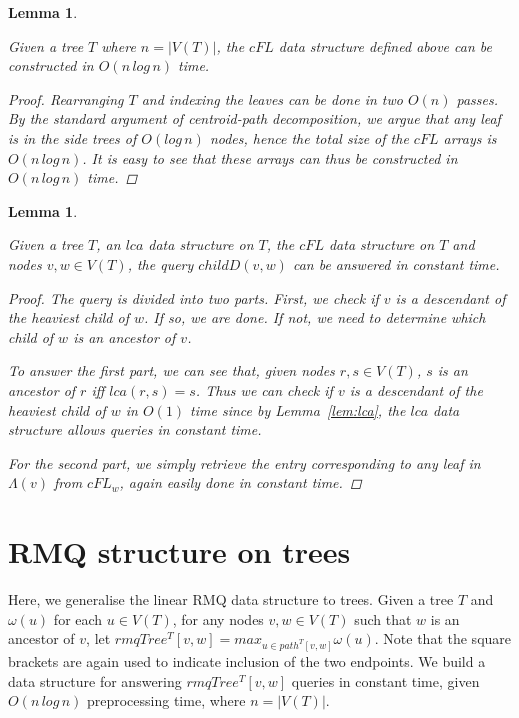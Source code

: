 \documentclass{article}
\newcommand{\leafset}{\Lambda}
\newcommand{\weight}{\omega}
\newtheorem{cfddatastructure}[incompatibility]{Lemma}
\newtheorem{cfdquery}[incompatibility]{Lemma}
\begin{document}
    \begin{cfddatastructure}
        \label{lem:cfddatastructure}

        Given a tree $T$ where $n = |V(T)|$, the $cFL$ data structure defined above can be constructed in $O(n\,log\,n)$ time.

        \begin{proof}
            Rearranging $T$ and indexing the leaves can be done in two $O(n)$ passes. By the standard argument of centroid-path decomposition, we argue that any leaf is in the side trees of $O(log\,n)$ nodes, hence the total size of the $cFL$ arrays is $O(n\,log\,n)$. It is easy to see that these arrays can thus be constructed in $O(n\,log\,n)$ time.
        \end{proof}
    \end{cfddatastructure}

    \medskip
    \begin{cfdquery}
        \label{lem:cfdquery}

        Given a tree $T$, an $lca$ data structure on $T$, the $cFL$ data structure on $T$ and nodes $v, w \in V(T)$, the query $childD(v, w)$ can be answered in constant time.

        \begin{proof}
            The query is divided into two parts. First, we check if $v$ is a descendant of the heaviest child of $w$. If so, we are done. If not, we need to determine which child of $w$ is an ancestor of $v$.

            To answer the first part, we can see that, given nodes $r, s \in V(T)$, $s$ is an ancestor of $r$ iff $lca(r, s) = s$. Thus we can check if $v$ is a descendant of the heaviest child of $w$ in $O(1)$ time since by Lemma~\ref{lem:lca}, the $lca$ data structure allows queries in constant time.

            For the second part, we simply retrieve the entry corresponding to any leaf in $\leafset(v)$ from $cFL_w$, again easily done in constant time.
        \end{proof}
    \end{cfdquery}

    \section{RMQ structure on trees}
    \label{sec:rmqtree}

    Here, we generalise the linear RMQ data structure to trees. Given a tree $T$ and $\weight(u)$ for each $u \in V(T)$, for any nodes $v, w \in V(T)$ such that $w$ is an ancestor of $v$, let $rmqTree^T[v, w] = max_{u \in path^T[v, w]}\weight(u)$. Note that the square brackets are again used to indicate inclusion of the two endpoints. We build a data structure for answering $rmqTree^T[v, w]$ queries in constant time, given $O(n\,log\,n)$ preprocessing time, where $n = |V(T)|$.
\end{document}

